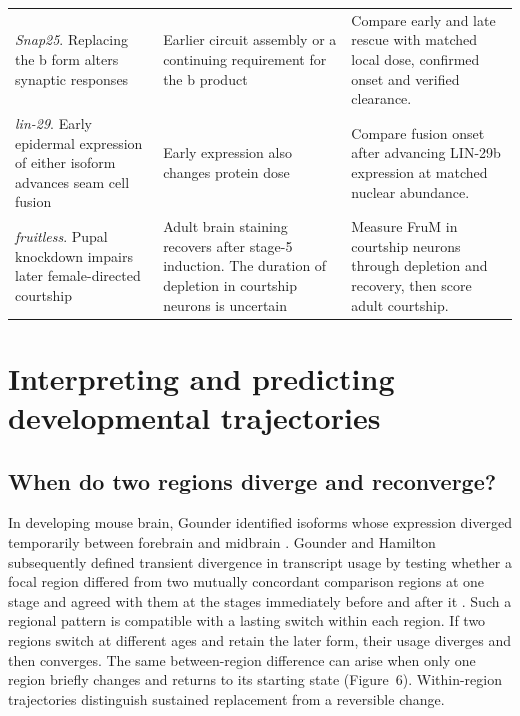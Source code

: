 \documentclass[11pt,a4paper]{article}
\begin{document}
\begin{table}[htbp]
\begin{tabularx}{\textwidth}{@{}*{3}{>{\raggedright\arraybackslash}X}@{}}
\addlinespace[9pt]

\textit{Snap25}. Replacing the b form alters synaptic responses \cite{Johansson2008} & Earlier circuit assembly or a continuing requirement for the b product & Compare early and late rescue with matched local dose, confirmed onset and verified clearance.\\

\addlinespace[9pt]

\textit{lin-29}. Early epidermal expression of either isoform advances seam cell fusion \cite{Azzi2020} & Early expression also changes protein dose & Compare fusion onset after advancing LIN-29b expression at matched nuclear abundance.\\

\addlinespace[9pt]

\textit{fruitless}. Pupal knockdown impairs later female-directed courtship \cite{Chen2021Fru} & Adult brain staining recovers after stage-5 induction. The duration of depletion in courtship neurons is uncertain & Measure FruM in courtship neurons through depletion and recovery, then score adult courtship.\\

\bottomrule\end{tabularx}

\end{table}

\section{Interpreting and predicting developmental trajectories}

\subsection{When do two regions diverge and reconverge?}

In developing mouse brain, Gounder identified isoforms whose expression diverged temporarily between forebrain and midbrain \cite{GounderThesis2025}. Gounder and Hamilton subsequently defined transient divergence in transcript usage by testing whether a focal region differed from two mutually concordant comparison regions at one stage and agreed with them at the stages immediately before and after it \cite{GounderHamilton2026}. Such a regional pattern is compatible with a lasting switch within each region. If two regions switch at different ages and retain the later form, their usage diverges and then converges. The same between-region difference can arise when only one region briefly changes and returns to its starting state (Figure~6). Within-region trajectories distinguish sustained replacement from a reversible change.
\end{document}
